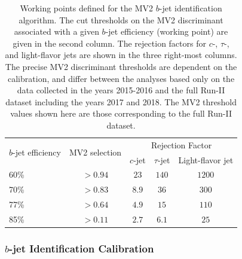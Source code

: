 \begin{table}[!htb]
    \caption{
        Working points defined for the MV2 $b$-jet identification algorithm.
        The cut thresholds on the MV2 discriminant associated with a given $b$-jet efficiency (working point)
        are given in the second column.
        The rejection factors for $c$-, $\tau$-, and light-flavor jets are shown in the three right-most columns.
        The precise MV2 discriminant thresholds are dependent on the calibration, and differ between the
        analyses based only on the data collected in the years 2015-2016 and the full Run-II dataset
        including the years 2017 and 2018.
        The MV2 threshold values shown here are those corresponding to the full Run-II dataset.
    }
    \label{tab:btag_wp}
    \begin{center}
        \begin{tabularx}{0.7\textwidth}{X|c|c|c|c}
        \hline
        \hline
        \multirow{2}{*}{$b$-jet efficiency} & \multirow{2}{*}{MV2 selection} & \multicolumn{3}{c}{Rejection Factor} \\
        \cline{3-5}
                &  & $c$-jet & $\tau$-jet & Light-flavor jet \\
        \hline
        60\%    & $>0.94$ & $23$ & $140$ & $1200$ \\
        70\%    & $>0.83$ & $8.9$ & $36$ & $300$ \\
        77\%    & $>0.64$ & $4.9$ & $15$ & $110$ \\
        85\%    & $>0.11$ & $2.7$ & $6.1$ & $25$ \\
        \hline
        \hline
        \end{tabularx}
    \end{center}
\end{table}

\subsubsection{$b$-jet Identification Calibration}
\label{sec:ftag_calib}

